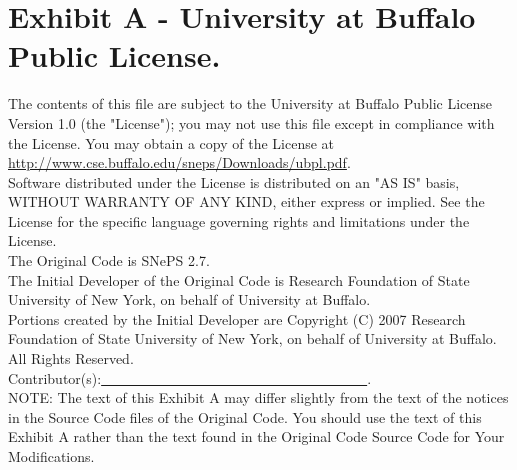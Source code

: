 \documentclass{book}
\begin{document}
\section*{Exhibit A - University at Buffalo Public License.}
The contents of this file are subject to the University at Buffalo
Public License Version 1.0 (the "License"); you may not use this
file except in compliance with the License. You may obtain a copy of
the License at \url{http://www.cse.buffalo.edu/sneps/Downloads/ubpl.pdf}.\\

\noindent Software distributed under the License is distributed on an "AS IS"
basis, WITHOUT WARRANTY OF ANY KIND, either express or implied. See the
License for the specific language governing rights and limitations
under the License.\\

\noindent The Original Code is SNePS 2.7.\\

\noindent The Initial Developer of the Original Code is Research Foundation of State University of New York, on behalf of University at Buffalo.\\

\noindent Portions created by the Initial Developer are Copyright (C) 2007 Research Foundation of State University of New York, on behalf of University at Buffalo. All Rights Reserved.\\

\noindent Contributor(s):\underline{~~~~~~~~~~~~~~~~~~~~~~~~~~~~~~~~~~~~~~}.\\

\noindent NOTE: The text of this Exhibit A may differ slightly from the text of the notices in the Source Code files of the Original Code. You should use the text of this Exhibit A rather than the text found in the Original Code Source Code for Your Modifications.

\clearpage
{}
\printindex
\end{document}
